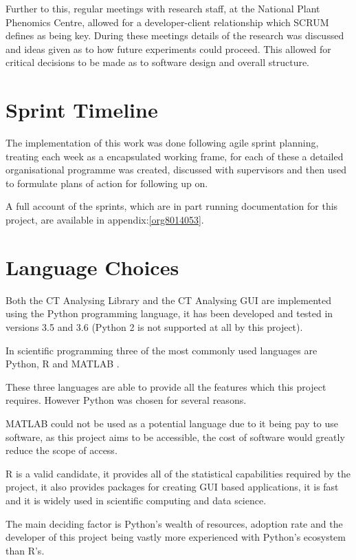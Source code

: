 \documentclass[11pt]{report}
\begin{document}
Further to this, regular meetings with research staff, at the National Plant Phenomics Centre,  allowed for a developer-client relationship which SCRUM defines as being key. During these meetings details of the research was discussed and ideas given as to how future experiments could proceed. This allowed for critical decisions to be made as to software design and overall structure.
\section{Sprint Timeline}
\label{sec:orga87ef29}
The implementation of this work was done following agile sprint planning, treating each week as a encapsulated working frame, for each of these a detailed organisational programme was created, discussed with supervisors and then used to formulate plans of action for following up on.

A full account of the sprints, which are in part running documentation for this project, are available in appendix:\ref{org8014053}.

\section{Language Choices}
\label{sec:orgb86b6ca}
Both the CT Analysing Library and the CT Analysing GUI are implemented using the Python programming language, it has been developed and tested in versions 3.5 and 3.6 (Python 2 is not supported at all by this project).

In scientific programming three of the most commonly used languages are Python, R and MATLAB \cite{Ozgur2016}.

These three languages are able to provide all the features which this project requires. However Python was chosen for several reasons.

MATLAB could not be used as a potential language due to it being pay to use software, as this project aims to be accessible, the cost of software would greatly reduce the scope of access.

R is a valid candidate, it provides all of the statistical capabilities required by the project, it also provides packages for creating GUI based applications, it is fast and it is widely used in scientific computing and data science.

The main deciding factor is Python's wealth of resources, adoption rate and the developer of this project being vastly more experienced with Python's ecosystem than R's.
\end{document}
